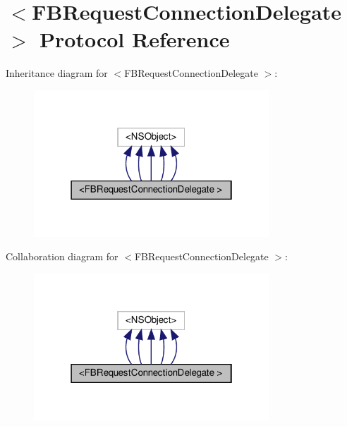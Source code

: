 \hypertarget{protocolFBRequestConnectionDelegate_01-p}{}\section{$<$F\+B\+Request\+Connection\+Delegate $>$ Protocol Reference}
\label{protocolFBRequestConnectionDelegate_01-p}


Inheritance diagram for $<$F\+B\+Request\+Connection\+Delegate $>$\+:
\nopagebreak
\begin{figure}[H]
\begin{center}
\leavevmode
\includegraphics[width=250pt]{protocolFBRequestConnectionDelegate_01-p__inherit__graph}
\end{center}
\end{figure}


Collaboration diagram for $<$F\+B\+Request\+Connection\+Delegate $>$\+:
\nopagebreak
\begin{figure}[H]
\begin{center}
\leavevmode
\includegraphics[width=250pt]{protocolFBRequestConnectionDelegate_01-p__coll__graph}
\end{center}
\end{figure}
